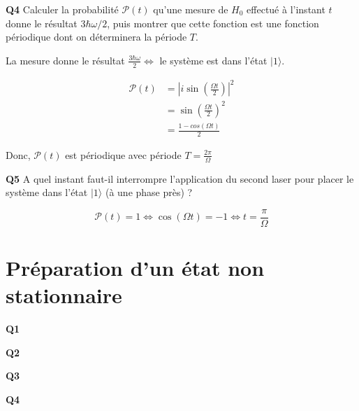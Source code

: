 \documentclass[french]{article}
\begin{document}
	\begin{tcolorbox}[colback=gray!5!white,colframe=gray!75!black]
		\textbf{\large{Q4}} Calculer la probabilité $\mathcal{P}(t)$ qu'une mesure de $H_0$ effectué à l'instant $t$ donne le résultat $3\hbar \omega /2$, puis montrer que cette fonction est une fonction périodique dont on déterminera la période $T$. 
	\end{tcolorbox}

	La mesure donne le résultat $\frac{3\hbar \omega}{2} \iff$ le système est dans l'état $|1\rangle$.
	
	\begin{align}
		\mathcal{P}(t) &= \left|i \sin\left(\frac{\Omega t}{2}\right)\right|^2\\
		&= \sin\left(\frac{\Omega t}{2}\right)^2\\
		&= \frac{1 - cos\left(\Omega t\right)}{2}
	\end{align}
	
	Donc, $\mathcal{P}(t)$ est périodique avec période $T = \frac{2\pi}{\Omega}$

	\begin{tcolorbox}[colback=gray!5!white,colframe=gray!75!black]
		\textbf{\large{Q5}} A quel instant faut-il interrompre l'application du second laser pour placer le système dans l'état $|1\rangle$ (à une phase près) ? 
	\end{tcolorbox}

	\[\mathcal{P}(t) = 1 \iff \cos(\Omega t) = -1 \iff t = \frac{\pi}{\Omega}\]

	\section{Préparation d'un état non stationnaire}

	\begin{tcolorbox}[colback=gray!5!white,colframe=gray!75!black]
		\textbf{\large{Q1}} 
	\end{tcolorbox}

	\begin{tcolorbox}[colback=gray!5!white,colframe=gray!75!black]
		\textbf{\large{Q2}} 
	\end{tcolorbox}

	\begin{tcolorbox}[colback=gray!5!white,colframe=gray!75!black]
		\textbf{\large{Q3}} 
	\end{tcolorbox}

	\begin{tcolorbox}[colback=gray!5!white,colframe=gray!75!black]
		\textbf{\large{Q4}} 
	\end{tcolorbox}
	
\end{document}
